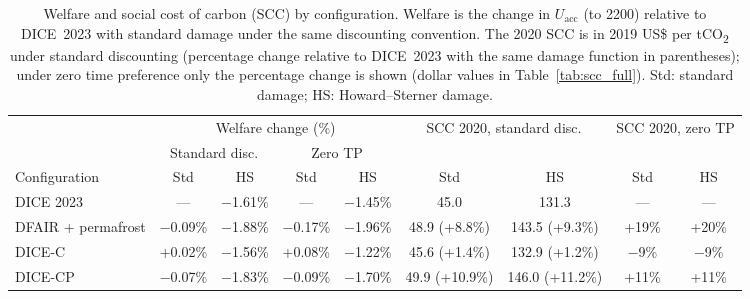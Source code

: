 \begin{table}[H]
\centering
\caption{Welfare and social cost of carbon (SCC) by configuration. Welfare is the change in $U_\text{acc}$ (to 2200) relative to DICE~2023 with standard damage under the same discounting convention. The 2020 SCC is in 2019 US\$ per tCO\textsubscript{2} under standard discounting (percentage change relative to DICE~2023 with the same damage function in parentheses); under zero time preference only the percentage change is shown (dollar values in Table~\ref{tab:scc_full}). Std: standard damage; HS: Howard--Sterner damage.}
\label{tab:welfare_scc}
\small
\setlength{\tabcolsep}{3pt}
\begin{tabular}{lcccccccc}
\toprule
 & \multicolumn{4}{c}{Welfare change (\%)} & \multicolumn{2}{c}{SCC 2020, standard disc.} & \multicolumn{2}{c}{SCC 2020, zero TP} \\
\cmidrule(lr){2-5}\cmidrule(lr){6-7}\cmidrule(lr){8-9}
 & \multicolumn{2}{c}{Standard disc.} & \multicolumn{2}{c}{Zero TP} & & & & \\
Configuration & Std & HS & Std & HS & Std & HS & Std & HS \\
\midrule
DICE 2023 & --- & $-$1.61\% & --- & $-$1.45\% & 45.0 & 131.3 & --- & --- \\
DFAIR + permafrost & $-$0.09\% & $-$1.88\% & $-$0.17\% & $-$1.96\% & 48.9 (+8.8\%) & 143.5 (+9.3\%) & +19\% & +20\% \\
DICE-C & +0.02\% & $-$1.56\% & +0.08\% & $-$1.22\% & 45.6 (+1.4\%) & 132.9 (+1.2\%) & $-$9\% & $-$9\% \\
DICE-CP & $-$0.07\% & $-$1.83\% & $-$0.09\% & $-$1.70\% & 49.9 (+10.9\%) & 146.0 (+11.2\%) & +11\% & +11\% \\
\bottomrule
\end{tabular}
\end{table}
